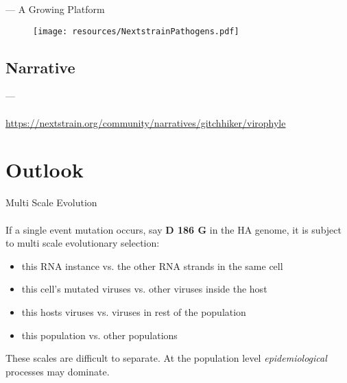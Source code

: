 \documentclass{beamer}
\begin{document}
\begin{darkframes}
    \begin{frame}{\secname --- A Growing Platform}
      \begin{figure}
        \texttt{[image: resources/NextstrainPathogens.pdf]}
        \vspace*{-.2cm}
        \caption{\footnotesize }
      \end{figure}
    \end{frame}

    \subsection{Narrative}

    \begin{frame}{\secname --- \subsecname}
      \framesubtitle{}
      \href{URL}{https://nextstrain.org/community/narratives/gitchhiker/virophyle}
    \end{frame}

    \section{Outlook}

    \begin{frame}{Multi Scale Evolution}
      \framesubtitle{}
      If a single event mutation occurs, say \textbf{D 186 G} in the HA genome, it is subject to multi scale evolutionary selection:
      \begin{itemize}
        \item this RNA instance vs. the other RNA strands in the same cell
        \item this cell's mutated viruses vs. other viruses inside the host
        \item this hosts viruses vs. viruses in rest of the population
        \item this population vs. other populations
      \end{itemize}
      These scales are difficult to separate. At the population level \textit{epidemiological} processes may dominate.
    \end{frame}


\end{darkframes}
\end{document}
